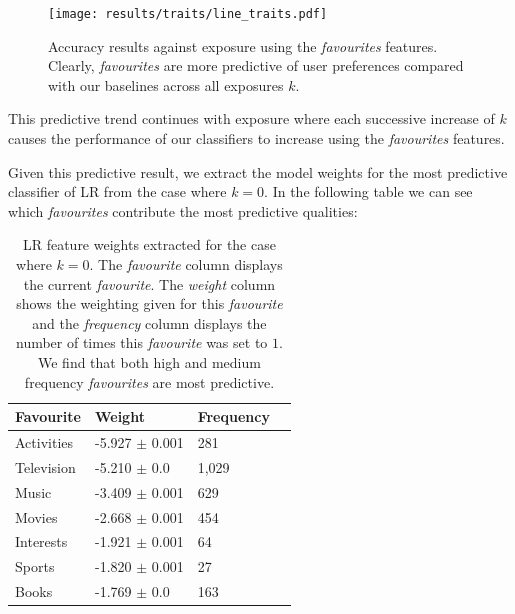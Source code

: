 \begin{figure}[h]
	\begin{center}
		\texttt{[image: results/traits/line\_traits.pdf]}
		\caption{Accuracy results against exposure using the \emph{favourites} features. Clearly, \emph{favourites} are more predictive of
				 user preferences compared with our baselines across all exposures $k$.}
	\end{center}
\end{figure}

This predictive trend continues with exposure where each successive increase of $k$ causes the performance of our classifiers to increase
using the \emph{favourites} features.

\clearpage

Given this predictive result, we extract the model weights for the most predictive classifier of LR from the case where $k=0$.
In the following table we can see which \emph{favourites} contribute the most predictive qualities:

\begin{table}[h]
\begin{minipage}[b]{1.0\textwidth}
\centering
  \begin{tabular}{|l|l|l|l|} %
  \hline
  		\textbf{Favourite} & \textbf{Weight} & \textbf{Frequency} \\ \hline
		Activities & -5.927 $\pm$ 0.001 & 281 \\ \hline
		Television & -5.210 $\pm$ 0.0 & 1,029 \\ \hline
		Music & -3.409 $\pm$ 0.001 & 629 \\ \hline
		Movies & -2.668 $\pm$ 0.001 & 454 \\ \hline
		Interests & -1.921 $\pm$ 0.001 & 64 \\ \hline
		Sports & -1.820 $\pm$ 0.001 & 27 \\ \hline		
		Books & -1.769 $\pm$ 0.0 & 163 \\ \hline		
  \end{tabular}
  \caption{LR feature weights extracted for the case where $k=0$. The \emph{favourite} column displays the current \emph{favourite}.
  The \emph{weight} column shows the weighting given for this \emph{favourite} and the \emph{frequency} column displays the number of times 
  this \emph{favourite} was set to $1$. We find that both high and medium frequency \emph{favourites} are most predictive.}
\end{minipage}
\end{table}

